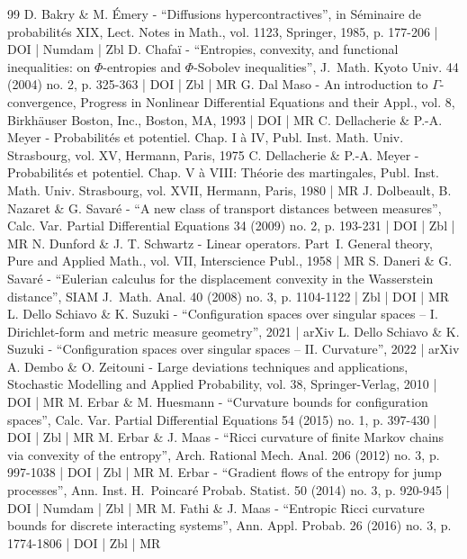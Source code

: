\documentclass[10pt]{amsart}
\theoremstyle{definition}
\theoremstyle{remark}
\begin{document}
\begin{thebibliography}{99}
D. Bakry \& M. Émery - “Diffusions hypercontractives”, in Séminaire de probabilités XIX, Lect. Notes in Math., vol. 1123, Springer, 1985, p. 177-206 | DOI | Numdam | Zbl
D. Chafaï - “Entropies, convexity, and functional inequalities: on $\Phi $-entropies and $\Phi $-Sobolev inequalities”, J. Math. Kyoto Univ. 44 (2004) no. 2, p. 325-363 | DOI | Zbl | MR
G. Dal Maso - An introduction to $\Gamma $-convergence, Progress in Nonlinear Differential Equations and their Appl., vol. 8, Birkhäuser Boston, Inc., Boston, MA, 1993 | DOI | MR
C. Dellacherie \& P.-A. Meyer - Probabilités et potentiel. Chap. I à IV, Publ. Inst. Math. Univ. Strasbourg, vol. XV, Hermann, Paris, 1975
C. Dellacherie \& P.-A. Meyer - Probabilités et potentiel. Chap. V à VIII: Théorie des martingales, Publ. Inst. Math. Univ. Strasbourg, vol. XVII, Hermann, Paris, 1980 | MR
J. Dolbeault, B. Nazaret \& G. Savaré - “A new class of transport distances between measures”, Calc. Var. Partial Differential Equations 34 (2009) no. 2, p. 193-231 | DOI | Zbl | MR
N. Dunford \& J. T. Schwartz - Linear operators. Part I. General theory, Pure and Applied Math., vol. VII, Interscience Publ., 1958 | MR
S. Daneri \& G. Savaré - “Eulerian calculus for the displacement convexity in the Wasserstein distance”, SIAM J. Math. Anal. 40 (2008) no. 3, p. 1104-1122 | Zbl | DOI | MR
L. Dello Schiavo \& K. Suzuki - “Configuration spaces over singular spaces – I. Dirichlet-form and metric measure geometry”, 2021 | arXiv
L. Dello Schiavo \& K. Suzuki - “Configuration spaces over singular spaces – II. Curvature”, 2022 | arXiv
A. Dembo \& O. Zeitouni - Large deviations techniques and applications, Stochastic Modelling and Applied Probability, vol. 38, Springer-Verlag, 2010 | DOI | MR
M. Erbar \& M. Huesmann - “Curvature bounds for configuration spaces”, Calc. Var. Partial Differential Equations 54 (2015) no. 1, p. 397-430 | DOI | Zbl | MR
M. Erbar \& J. Maas - “Ricci curvature of finite Markov chains via convexity of the entropy”, Arch. Rational Mech. Anal. 206 (2012) no. 3, p. 997-1038 | DOI | Zbl | MR
M. Erbar - “Gradient flows of the entropy for jump processes”, Ann. Inst. H. Poincaré Probab. Statist. 50 (2014) no. 3, p. 920-945 | DOI | Numdam | Zbl | MR
M. Fathi \& J. Maas - “Entropic Ricci curvature bounds for discrete interacting systems”, Ann. Appl. Probab. 26 (2016) no. 3, p. 1774-1806 | DOI | Zbl | MR

\end{thebibliography}
\end{document}
